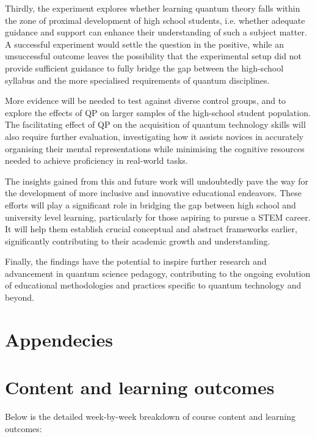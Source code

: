 Thirdly, the experiment explores whether learning quantum theory falls within the zone of proximal development of high school students, i.e. whether adequate guidance and support can enhance their understanding of such a subject matter.
A successful experiment would settle the question in the positive, while an unsuccessful outcome leaves the possibility that the experimental setup did not provide sufficient guidance to fully bridge the gap between the high-school syllabus and the more specialised requirements of quantum disciplines.

More evidence will be needed to test against diverse control groups, and to explore the effects of QP on larger samples of the high-school student population.
The facilitating effect of QP on the acquisition of quantum technology skills will also require further evaluation, investigating how it assists novices in accurately organising their mental representations while minimising the cognitive resources needed to achieve proficiency in real-world tasks.

The insights gained from this and future work will undoubtedly pave the way for the development of more inclusive and innovative educational endeavors. These efforts will play a significant role in bridging the gap between high school and university level learning, particularly for those aspiring to pursue a STEM career. It will help them establish crucial conceptual and abstract frameworks earlier, significantly contributing to their academic growth and understanding. 

Finally, the findings have the potential to inspire further research and advancement in quantum science pedagogy, contributing to the ongoing evolution of educational methodologies and practices specific to quantum technology and beyond. 



\section*{Appendecies}

\section{Content and learning outcomes}

Below is the detailed week-by-week breakdown of course content and learning outcomes:

